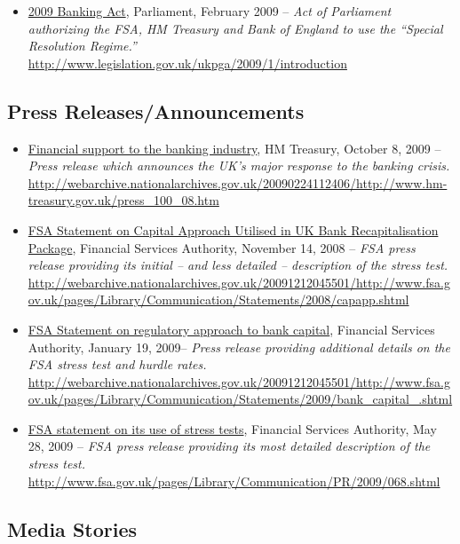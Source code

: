 \documentclass[12pt]{article}
\begin{document}
\begin{itemize}
\item
\ul{2009 Banking Act}, Parliament, February 2009 -- \emph{Act of Parliament authorizing the FSA, HM Treasury and Bank of England to use the ``Special Resolution Regime.''} \url{http://www.legislation.gov.uk/ukpga/2009/1/introduction}
\end{itemize}

\subsection{Press Releases/Announcements}

\begin{itemize}
\item
\ul{Financial support to the banking industry}, HM Treasury, October 8, 2009 -- \emph{Press release which
  announces the UK's major response to the banking crisis.} \url{http://webarchive.nationalarchives.gov.uk/20090224112406/http://www.hm-treasury.gov.uk/press_100_08.htm}
\item
\ul{FSA Statement on Capital Approach Utilised in UK Bank Recapitalisation Package}, Financial Services Authority, November 14, 2008 -- \emph{FSA press release providing its initial -- and less detailed -- description of the stress test.} \url{http://webarchive.nationalarchives.gov.uk/20091212045501/http://www.fsa.gov.uk/pages/Library/Communication/Statements/2008/capapp.shtml}
\item
\ul{FSA Statement on regulatory approach to bank capital}, Financial Services Authority, January 19, 2009-- \emph{Press release
  providing additional details on the FSA stress test and hurdle rates.} \url{http://webarchive.nationalarchives.gov.uk/20091212045501/http://www.fsa.gov.uk/pages/Library/Communication/Statements/2009/bank_capital_.shtml}
\item
\ul{FSA statement on its use of stress tests}, Financial Services Authority, May 28, 2009 -- \emph{FSA press release providing its most detailed description of the stress test.} \url{http://www.fsa.gov.uk/pages/Library/Communication/PR/2009/068.shtml}
\end{itemize}

\subsection{Media Stories}
\end{document}
